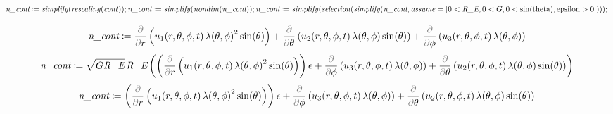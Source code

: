\documentclass{article}
\begin{document}
\begin{Maple Normal}
{$ \displaystyle 
\\
 \textit{n\_cont} \coloneqq \mathit{simplify} (\mathit{rescaling} (\mathit{cont}));\textit{n\_cont} \coloneqq \mathit{simplify} (\mathit{nondim} (\textit{n\_cont}));\textit{n\_cont} \coloneqq \mathit{simplify} (\mathit{selection} (\mathit{simplify} (\textit{n\_cont} ,\mathit{assume} =[0<\textit{R\_E} ,0<G ,0<\sin (\mathrm{theta}),\mathrm{epsilon}>0]))); $}
\end{Maple Normal}
\begin{dmath*}
\textit{n\_cont} \coloneqq \frac{\textcolor{gray}{\partial}}{\textcolor{gray}{\partial}r}\left(u_{1}\! \left(r ,\theta ,\phi ,t \right) \lambda \! \left(\theta ,\phi \right)^{2} \sin \! \left(\theta \right)\right)+\frac{\textcolor{gray}{\partial}}{\textcolor{gray}{\partial}\theta}\left(u_{2}\! \left(r ,\theta ,\phi ,t \right) \lambda \! \left(\theta ,\phi \right) \sin \! \left(\theta \right)\right)+\frac{\textcolor{gray}{\partial}}{\textcolor{gray}{\partial}\phi}\left(u_{3}\! \left(r ,\theta ,\phi ,t \right) \lambda \! \left(\theta ,\phi \right)\right)
\end{dmath*}
\vspace{-\bigskipamount}
\begin{dmath*}
\textit{n\_cont} \coloneqq \sqrt{G \textit{R\_E}}\, \textit{R\_E} \left(\left(\frac{\textcolor{gray}{\partial}}{\textcolor{gray}{\partial}r}\left(u_{1}\! \left(r ,\theta ,\phi ,t \right) \lambda \! \left(\theta ,\phi \right)^{2} \sin \! \left(\theta \right)\right)\right) \epsilon +\frac{\textcolor{gray}{\partial}}{\textcolor{gray}{\partial}\phi}\left(u_{3}\! \left(r ,\theta ,\phi ,t \right) \lambda \! \left(\theta ,\phi \right)\right)+\frac{\textcolor{gray}{\partial}}{\textcolor{gray}{\partial}\theta}\left(u_{2}\! \left(r ,\theta ,\phi ,t \right) \lambda \! \left(\theta ,\phi \right) \sin \! \left(\theta \right)\right)\right)
\end{dmath*}
\vspace{-\bigskipamount}
\begin{dmath}\label{(17)}
\textit{n\_cont} \coloneqq \left(\frac{\textcolor{gray}{\partial}}{\textcolor{gray}{\partial}r}\left(u_{1}\! \left(r ,\theta ,\phi ,t \right) \lambda \! \left(\theta ,\phi \right)^{2} \sin \! \left(\theta \right)\right)\right) \epsilon +\frac{\textcolor{gray}{\partial}}{\textcolor{gray}{\partial}\phi}\left(u_{3}\! \left(r ,\theta ,\phi ,t \right) \lambda \! \left(\theta ,\phi \right)\right)+\frac{\textcolor{gray}{\partial}}{\textcolor{gray}{\partial}\theta}\left(u_{2}\! \left(r ,\theta ,\phi ,t \right) \lambda \! \left(\theta ,\phi \right) \sin \! \left(\theta \right)\right)
\end{dmath}
\end{document}
